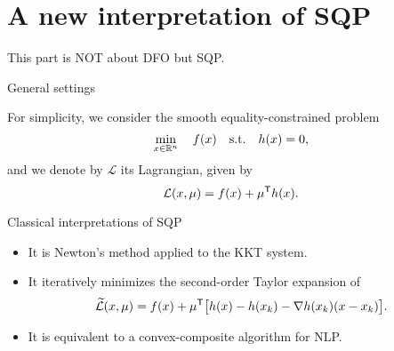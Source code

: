 \documentclass[
]{talk}
\newcommand*{\ceq}{h}
\newcommand*{\iter}[1][]{x\ifblank{#1}{}{_{#1}}}
\newcommand*{\lag}{\mathcal{L}}
\newcommand*{\lagalt}{\widetilde{\mathcal{L}}}
\newcommand*{\lmeq}[1][]{\mu\ifblank{#1}{}{_{#1}}}
\newcommand*{\obj}{f}
\begin{document}
\section{A new interpretation of SQP}

\begin{frame}[standout]
     This part is \alert{NOT} about DFO but SQP.
\end{frame}

\begin{frame}{General settings}

    For simplicity, we consider the \alert{smooth} equality-constrained problem
    \begin{equation*}
        \min_{\iter \in \R^n} \quad \obj(\iter) \quad \textrm{s.t.} \quad \ceq(\iter) = 0\text{,}
    \end{equation*}
    and we denote by $\lag$ its \alert{Lagrangian}, given by
    \begin{equation*}
        \lag(\iter, \lmeq) = \obj(\iter) + \lmeq^{\T} \ceq(\iter)\text{.}
    \end{equation*}

    \begin{block}{Classical interpretations of SQP}
        \begin{itemize}
            \item It is \alert{Newton}'s method applied to the KKT system.
            \item It iteratively minimizes the second-order Taylor expansion of
            \begin{equation*}
                \lagalt(\iter, \lmeq) = \obj(\iter) + \mu^{\T} \big[\ceq(\iter) - \ceq(\iter[k]) - \nabla \ceq(\iter[k]) (\iter - \iter[k])\big]\text{.}
            \end{equation*}
            \item It is equivalent to a convex-composite algorithm for NLP.
        \end{itemize}
    \end{block}
\end{frame}
\end{document}

